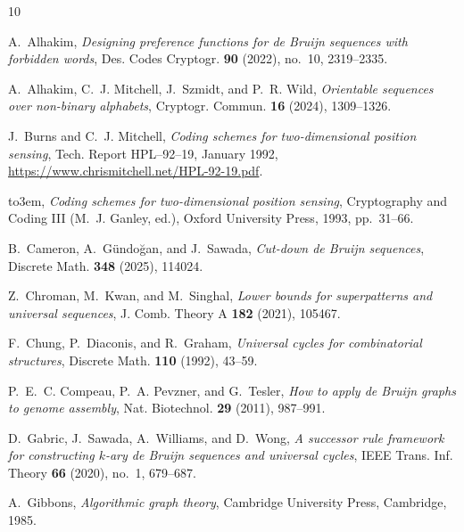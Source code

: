 \documentclass[a4paper,11pt]{article}
\theoremstyle{plain}
\theoremstyle{definition}
\theoremstyle{remark}
\begin{document}
%
%
\providecommand{\bysame}{\leavevmode\hbox to3em{\hrulefill}\thinspace}
\providecommand{\MR}{\relax\ifhmode\unskip\space\fi MR }
\providecommand{\MRhref}[2]{%
  \href{http://www.ams.org/mathscinet-getitem?mr=#1}{#2}
} \providecommand{\href}[2]{#2}
\begin{thebibliography}{10}

 A.~Alhakim, \emph{Designing preference functions for de {Bruijn} sequences
    with
  forbidden words}, Des. Codes Cryptogr. \textbf{90} (2022), no.~10,
  2319--2335.

 A.~Alhakim, C.~J. Mitchell, J.~Szmidt, and P.~R. Wild, \emph{Orientable
  sequences over non-binary alphabets}, Cryptogr. Commun. \textbf{16} (2024),
  1309--1326.

 J.~Burns and C.~J. Mitchell, \emph{Coding schemes for two-dimensional
    position
  sensing}, Tech. Report HPL--92--19, January 1992,
  \url{https://www.chrismitchell.net/HPL-92-19.pdf}.

 \bysame, \emph{Coding schemes for two-dimensional position sensing},
  Cryptography and Coding III (M.~J. Ganley, ed.), Oxford University Press,
  1993, pp.~31--66.

 B.~Cameron, A.~G{\"u}ndo{\u g}an, and J.~Sawada, \emph{Cut-down de {Bruijn}
  sequences}, Discrete Math. \textbf{348} (2025), 114024.

 Z.~Chroman, M.~Kwan, and M.~Singhal, \emph{Lower bounds for superpatterns
    and
  universal sequences}, J. Comb. Theory {A} \textbf{182} (2021), 105467.

 F.~Chung, P.~Diaconis, and R.~Graham, \emph{Universal cycles for
    combinatorial
  structures}, Discrete Math. \textbf{{\bf 110}} (1992), 43--59.

 P.~E.~C. Compeau, P.~A. Pevzner, and G.~Tesler, \emph{How to apply de
    {Bruijn}
  graphs to genome assembly}, Nat. Biotechnol. \textbf{29} (2011), 987--991.

 D.~Gabric, J.~Sawada, A.~Williams, and D.~Wong, \emph{A successor rule
  framework for constructing $k$-ary de {Bruijn} sequences and universal
  cycles}, {IEEE} Trans. Inf. Theory \textbf{66} (2020), no.~1, 679--687.

 A.~Gibbons, \emph{Algorithmic graph theory}, Cambridge University Press,
  Cambridge, 1985.


\end{thebibliography}
\end{document}
